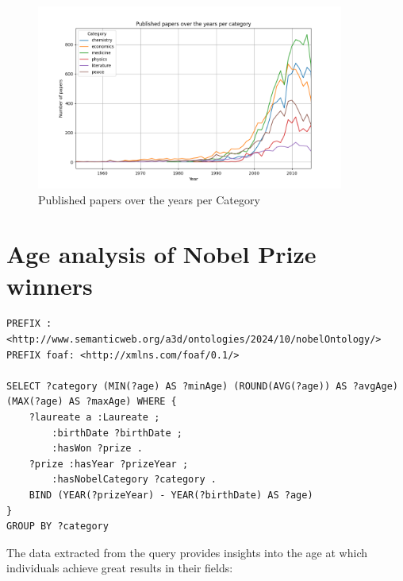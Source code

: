 \documentclass{article}
\begin{document}
\begin{figure}[ht]
	\label{fig:papersPerCategory}
	\centering
	\includegraphics[width=0.9\textwidth]{../queries/plots/papersPerCategory.png}
    \caption{Published papers over the years per Category}
\end{figure}

\newpage

\section{Age analysis of Nobel Prize winners} \label{winners age}
\begin{lstlisting}
PREFIX : <http://www.semanticweb.org/a3d/ontologies/2024/10/nobelOntology/>
PREFIX foaf: <http://xmlns.com/foaf/0.1/>

SELECT ?category (MIN(?age) AS ?minAge) (ROUND(AVG(?age)) AS ?avgAge) (MAX(?age) AS ?maxAge) WHERE {
    ?laureate a :Laureate ;
        :birthDate ?birthDate ;
        :hasWon ?prize .
    ?prize :hasYear ?prizeYear ;
        :hasNobelCategory ?category .
    BIND (YEAR(?prizeYear) - YEAR(?birthDate) AS ?age)
}
GROUP BY ?category
\end{lstlisting}

\vspace{1em}

The data extracted from the query provides insights into the age at which individuals achieve great results in
their fields:
\end{document}

